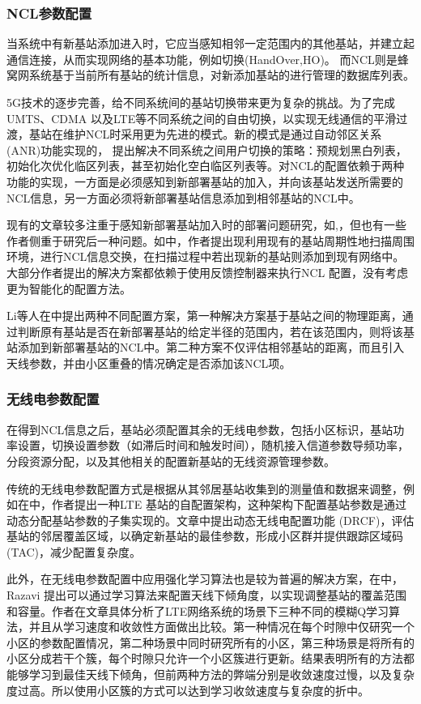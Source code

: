 ﻿\documentclass[11pt,draftclsnofoot,onecolumn,journal,letterpaper]{IEEEtran}
\begin{document}
\subsubsection{NCL参数配置}

当系统中有新基站添加进入时，它应当感知相邻一定范围内的其他基站，并建立起通信连接，从而实现网络的基本功能，例如切换(HandOver,HO)。 而NCL则是蜂窝网系统基于当前所有基站的统计信息，对新添加基站的进行管理的数据库列表。

5G技术的逐步完善，给不同系统间的基站切换带来更为复杂的挑战。为了完成UMTS、CDMA 以及LTE等不同系统之间的自由切换，以实现无线通信的平滑过渡，基站在维护NCL时采用更为先进的模式。新的模式是通过自动邻区关系(ANR)功能实现的，\cite{3gpp.32.511} 提出解决不同系统之间用户切换的策略：预规划黑白列表，初始化次优化临区列表，甚至初始化空白临区列表等。对NCL的配置依赖于两种功能的实现，一方面是必须感知到新部署基站的加入，并向该基站发送所需要的NCL信息，另一方面必须将新部署基站信息添加到相邻基站的NCL中。

现有的文章较多注重于感知新部署基站加入时的部署问题研究，如\cite{Lee2014},\cite{Kim2010}，但也有一些作者侧重于研究后一种问题。如\cite{Wainio2016}中，作者提出现利用现有的基站周期性地扫描周围环境，进行NCL信息交换，在扫描过程中若出现新的基站则添加到现有网络中。大部分作者提出的解决方案都依赖于使用反馈控制器来执行NCL 配置，没有考虑更为智能化的配置方法。

Li等人在\cite{Li2007}中提出两种不同配置方案，第一种解决方案基于基站之间的物理距离，通过判断原有基站是否在新部署基站的给定半径的范围内，若在该范围内，则将该基站添加到新部署基站的NCL中。第二种方案不仅评估相邻基站的距离，而且引入天线参数，并由小区重叠的情况确定是否添加该NCL项。


\subsubsection{无线电参数配置}
在得到NCL信息之后，基站必须配置其余的无线电参数，包括小区标识，基站功率设置，切换设置参数（如滞后时间和触发时间），随机接入信道参数导频功率，分段资源分配，以及其他相关的配置新基站的无线资源管理参数。

传统的无线电参数配置方式是根据从其邻居基站收集到的测量值和数据来调整，例如在\cite{Sanneck2010}中，作者提出一种LTE 基站的自配置架构，这种架构下配置基站参数是通过动态分配基站参数的子集实现的。文章中提出动态无线电配置功能 (DRCF)，评估基站的邻居覆盖区域，以确定新基站的最佳参数，形成小区群并提供跟踪区域码(TAC)，减少配置复杂度。

此外，在无线电参数配置中应用强化学习算法也是较为普遍的解决方案，在\cite{Razavi2010}中，Razavi 提出可以通过学习算法来配置天线下倾角度，以实现调整基站的覆盖范围和容量。作者在文章具体分析了LTE网络系统的场景下三种不同的模糊Q学习算法，并且从学习速度和收敛性方面做出比较。第一种情况在每个时隙中仅研究一个小区的参数配置情况，第二种场景中同时研究所有的小区，第三种场景是将所有的小区分成若干个簇，每个时隙只允许一个小区簇进行更新。结果表明所有的方法都能够学习到最佳天线下倾角，但前两种方法的弊端分别是收敛速度过慢，以及复杂度过高。所以使用小区簇的方式可以达到学习收敛速度与复杂度的折中。
\end{document}
